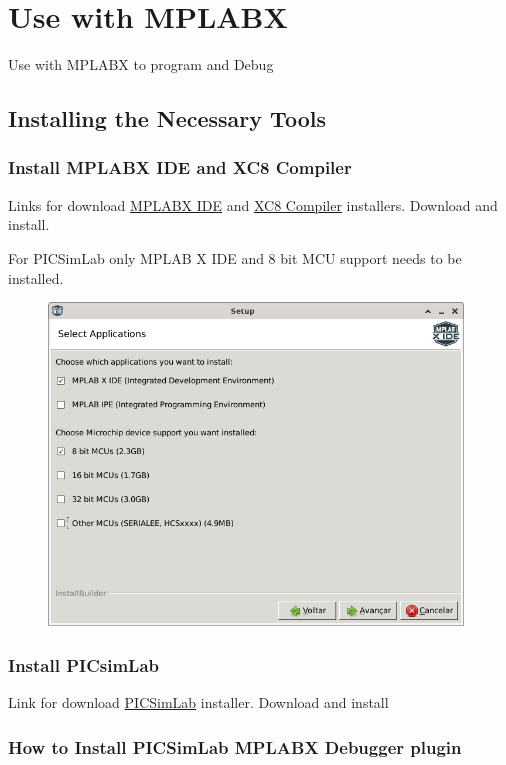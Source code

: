 \chapter{Use with MPLABX}

Use with MPLABX to program and Debug

\section{Installing the Necessary Tools}

\subsection{Install MPLABX IDE and XC8 Compiler}
Links for download  \href{http://www.microchip.com/mplabx}{MPLABX IDE} and \href{http://www.microchip.com/compilers}{XC8 Compiler} installers.
Download and install.

For PICSimLab only MPLAB X IDE and 8 bit MCU support needs to be installed. 
\begin{figure}[H]
\center
\includegraphics[width=0.98\textwidth]{img/hmd/mplab00.png} 
\end{figure} 

\subsection{Install PICsimLab}

Link for download \href{https://github.com/lcgamboa/picsimlab/releases}{PICSimLab} installer. 
Download and install

\subsection{How to Install PICSimLab MPLABX Debugger plugin}

